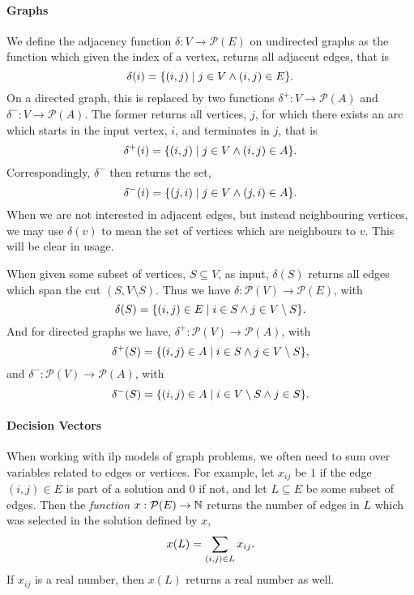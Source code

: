 \paragraph{Graphs}

We define the adjacency function $\delta : V \to \mathcal{P} (E)$ on undirected graphs as
the function which given the index of a vertex, returns all adjacent edges, that is
$$\delta(i) = \{(i,j) \mid j \in V \wedge (i, j) \in E\}\mathnormal{.}$$
On a directed graph, this is replaced by two functions
$\delta^+ : V \to \mathcal{P} (A)$
and $\delta^-: V \to \mathcal{P} (A)$.
The former returns all vertices, $j$, for which there exists an arc
which starts in the input vertex, $i$, and terminates in $j$, that is
$$\delta^+(i) = \{(i, j) \mid j \in V \wedge (i, j) \in A\}\mathnormal{.}$$
Correspondingly, $\delta^-$ then returns the set,
$$\delta^-(i) = \{(j, i) \mid j \in V \wedge (j, i) \in A\}\mathnormal{.}$$
When we are not interested in adjacent edges, but instead neighbouring vertices,
we may use $\delta(v)$ to mean the set of vertices which are neighbours to $v$.
This will be clear in usage.


When given some subset of vertices, $S \subseteq V$, as input,
$\delta(S)$ returns all edges which span the cut $(S, V \setminus S)$.
Thus we have $\delta : \mathcal{P}(V) \to \mathcal{P}(E)$, with
$$\delta(S) = \{(i,j) \in E \mid i \in S \wedge j \in V \setminus S\}\mathnormal{.}$$
And for directed graphs we have, $\delta^+ : \mathcal{P}(V) \to \mathcal{P}(A)$, with
$$\delta^+(S) = \{(i,j) \in A \mid i \in S \wedge j \in V \setminus S\}\mathnormal{,}$$
and $\delta^- : \mathcal{P}(V) \to \mathcal{P}(A)$, with
$$\delta^-(S) = \{(i,j) \in A \mid i \in V \setminus S \wedge j \in S\}\mathnormal{.}$$

\paragraph{Decision Vectors}

When working with \gls{ilp} models of graph problems, we often need to sum over variables
related to edges or vertices. For example, let $x_{ij}$ be $1$ if the edge $(i,j) \in E$
is part of a solution and $0$ if not, and let $L \subseteq E$ be some subset of edges.
Then the \textit{function} $x : \mathcal{P} (E) \to \mathbb{N}$ returns the number of edges
 in $L$ which was selected in the solution defined by $x$,
 $$x(L) = \sum_{(i, j) \in L} x_{ij}\mathnormal{.}$$
 If $x_{ij}$ is a real number, then $x(L)$ returns a real number as well.

